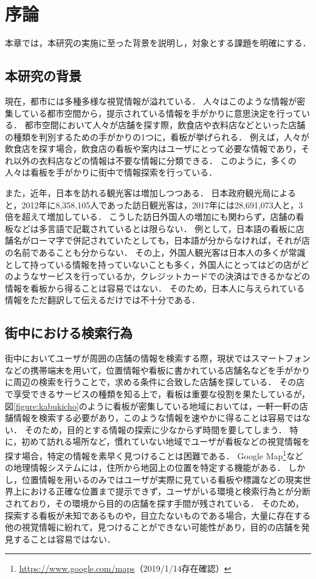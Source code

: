 \chapter{序論}
\label{chapter:introduction}

本章では，本研究の実施に至った背景を説明し，対象とする課題を明確にする．

\section{本研究の背景}
  現在，都市には多種多様な視覚情報が溢れている．
  人々はこのような情報が密集している都市空間から，提示されている情報を手がかりに意思決定を行っている．
  都市空間において人々が店舗を探す際，飲食店や衣料店などといった店舗の種類を判別するための手がかりの1つに，看板が挙げられる．
  例えば，人々が飲食店を探す場合，飲食店の看板や案内はユーザにとって必要な情報であり，それ以外の衣料店などの情報は不要な情報に分類できる．
  このように，多くの人々は看板を手がかりに街中で情報探索を行っている．

  また，近年，日本を訪れる観光客は増加しつつある．
  日本政府観光局によると，2012年に8,358,105人であった訪日観光客は，2017年には28,691,073人と，3倍を超えて増加している\cite{JNTO:2018}．
  こうした訪日外国人の増加にも関わらず，店舗の看板などは多言語で記載されているとは限らない．
  例として，日本語の看板に店舗名がローマ字で併記されていたとしても，日本語が分からなければ，それが店の名前であることも分からない．
  その上，外国人観光客は日本人の多くが常識として持っている情報を持っていないことも多く，外国人にとってはどの店がどのようなサービスを行っているか，クレジットカードでの決済はできるかなどの情報を看板から得ることは容易ではない．
  そのため，日本人に与えられている情報をただ翻訳して伝えるだけでは不十分である\cite{Hayashida:2005}．

\section{街中における検索行為}
  街中においてユーザが周囲の店舗の情報を検索する際，現状ではスマートフォンなどの携帯端末を用いて，位置情報や看板に書かれている店舗名などを手がかりに周辺の検索を行うことで，求める条件に合致した店舗を探している．
  その店で享受できるサービスの種類を知る上で，看板は重要な役割を果たしているが，図\ref{figure:kabukicho}のように看板が密集している地域においては，一軒一軒の店舗情報を検索する必要があり，このような情報を速やかに得ることは容易ではない．
  そのため，目的とする情報の探索に少なからず時間を要してしまう．
  特に，初めて訪れる場所など，慣れていない地域でユーザが看板などの視覚情報を探す場合，特定の情報を素早く見つけることは困難である．
  Google Map\footnote{\url{https://www.google.com/maps}（2019/1/14存在確認）}などの地理情報システムには，住所から地図上の位置を特定する機能がある．
  しかし，位置情報を用いるのみではユーザが実際に見ている看板や標識などの現実世界上における正確な位置まで提示できず，ユーザがいる環境と検索行為とが分断されており，その環境から目的の店舗を探す手間が残されている．
  そのため，探索する看板が未知であるものや，目立たないものである場合，大量に存在する他の視覚情報に紛れて，見つけることができない可能性があり，目的の店舗を発見することは容易ではない．


